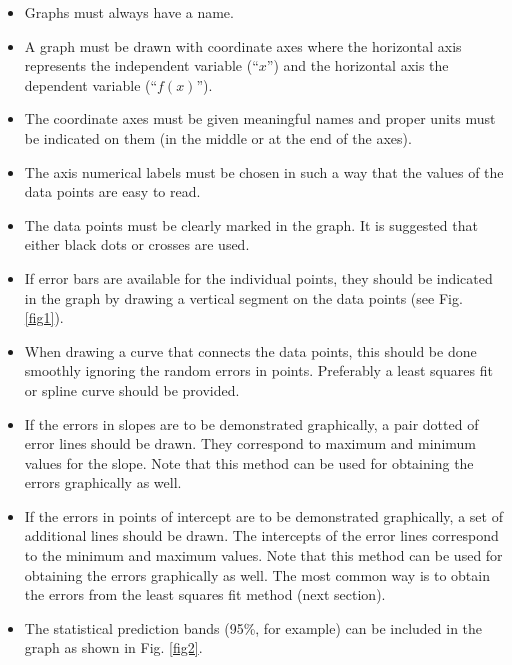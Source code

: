 \documentclass[byrevtex,amssymb,aps,pra,floatfix,letterpaper]{revtex4}
\begin{document}
\begin{itemize}
\item Graphs must always have a name.
\item A graph must be drawn with coordinate axes where the horizontal axis represents the independent variable (``$x$'') and the horizontal axis the dependent variable (``$f(x)$'').
\item The coordinate axes must be given meaningful names and proper units must be indicated on them (in the middle or at the end of the axes).
\item The axis numerical labels must be chosen in such a way that the values of the data points are easy to read.
\item The data points must be clearly marked in the graph. It is suggested that either black dots or crosses are used.
\item If error bars are available for the individual points, they should be indicated in the graph by drawing a vertical segment on the data points (see Fig. \ref{fig1}).
\item When drawing a curve that connects the data points, this should be done smoothly ignoring the random errors in points. Preferably a least squares fit or spline curve should be provided.
\item If the errors in slopes are to be demonstrated graphically, a pair dotted of error lines should be drawn. They correspond to maximum and minimum values for the slope. Note that this method can be used for obtaining the errors graphically as well.
\item If the errors in points of intercept are to be demonstrated graphically, a set of additional lines should be drawn. The intercepts of the error lines correspond to the minimum and maximum values. Note that this method can be used for obtaining the errors graphically as well. The most common way is to obtain the errors from the least squares fit method (next section).
\item The statistical prediction bands (95\%, for example) can be included in the graph as shown in Fig. \ref{fig2}.
\end{itemize}
\end{document}

